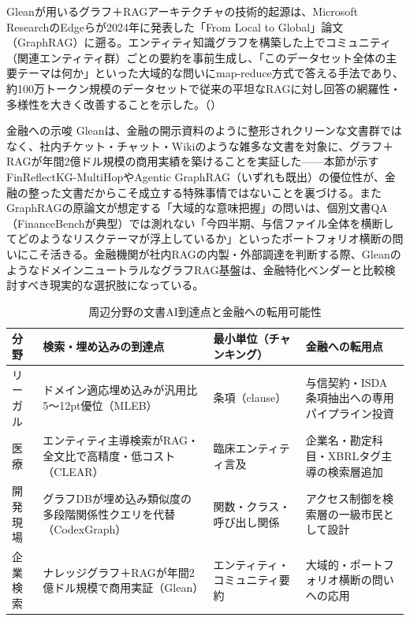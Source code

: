 Gleanが用いるグラフ＋RAGアーキテクチャの技術的起源は、Microsoft ResearchのEdgeらが2024年に発表した「From Local to Global」論文（GraphRAG）に遡る。エンティティ知識グラフを構築した上でコミュニティ（関連エンティティ群）ごとの要約を事前生成し、「このデータセット全体の主要テーマは何か」といった大域的な問いにmap-reduce方式で答える手法であり、約100万トークン規模のデータセットで従来の平坦なRAGに対し回答の網羅性・多様性を大きく改善することを示した。（\cite{y02graphrag2024}）

\begin{insight}{金融への示唆}
Gleanは、金融の開示資料のように整形されクリーンな文書群ではなく、社内チケット・チャット・Wikiのような雑多な文書を対象に、グラフ＋RAGが年間2億ドル規模の商用実績を築けることを実証した——本節が示すFinReflectKG-MultiHopやAgentic GraphRAG（いずれも既出）の優位性が、金融の整った文書だからこそ成立する特殊事情ではないことを裏づける。またGraphRAGの原論文が想定する「大域的な意味把握」の問いは、個別文書QA（FinanceBenchが典型）では測れない「今四半期、与信ファイル全体を横断してどのようなリスクテーマが浮上しているか」といったポートフォリオ横断の問いにこそ活きる。金融機関が社内RAGの内製・外部調達を判断する際、GleanのようなドメインニュートラルなグラフRAG基盤は、金融特化ベンダーと比較検討すべき現実的な選択肢になっている。
\end{insight}

\begin{table}[htbp]
\centering
\small
\caption{周辺分野の文書AI到達点と金融への転用可能性}
\label{tab:crossdomain-docai}
\begin{tabularx}{\textwidth}{@{}
  >{\raggedright\arraybackslash}p{1.5cm}
  >{\raggedright\arraybackslash\hsize=1.30\hsize}X
  >{\raggedright\arraybackslash\hsize=0.70\hsize}X
  >{\raggedright\arraybackslash\hsize=1.00\hsize}X @{}}
\toprule
\textbf{分野} & \textbf{検索・埋め込みの到達点} & \textbf{最小単位（チャンキング）} & \textbf{金融への転用点} \\
\midrule
リーガル & ドメイン適応埋め込みが汎用比\,5〜12pt優位（MLEB）\cite{y02mleb2025} & 条項（clause） & 与信契約・ISDA条項抽出への専用パイプライン投資 \\
医療 & エンティティ主導検索がRAG・全文比で高精度・低コスト（CLEAR）\cite{y02clear2025} & 臨床エンティティ言及 & 企業名・勘定科目・XBRLタグ主導の検索層追加 \\
開発現場 & グラフDBが埋め込み類似度の多段階関係性クエリを代替（CodexGraph）\cite{y02codexgraph2024} & 関数・クラス・呼び出し関係 & アクセス制御を検索層の一級市民として設計 \\
企業検索 & ナレッジグラフ＋RAGが年間2億ドル規模で商用実証（Glean）\cite{y02glean2025} & エンティティ・コミュニティ要約 & 大域的・ポートフォリオ横断の問いへの応用 \\
\bottomrule
\end{tabularx}
\end{table}

